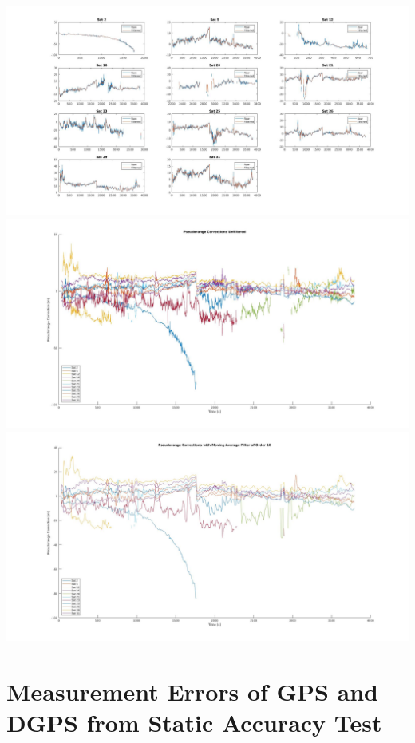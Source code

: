 \centering
\includegraphics[width=\textwidth]{appendix/C_Matlab/PRCs_single.jpg}
\includegraphics[width=\textwidth]{appendix/C_Matlab/PRCs_unfiltered.jpg}
\includegraphics[width=\textwidth]{appendix/C_Matlab/PRCs_filtered.jpg}

\newpage

\section{Measurement Errors of GPS and DGPS from Static Accuracy Test}







